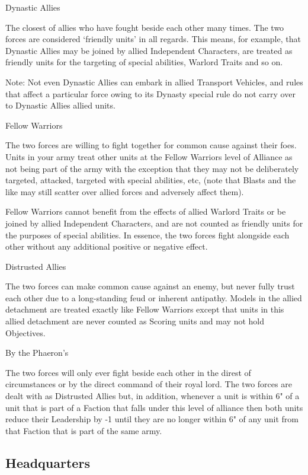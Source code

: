 \noindent
\yellowskull Dynastic Allies

The closest of allies who have fought beside each other many times. The two forces are considered ‘friendly units’ in all regards. This means, for example, that Dynastic Allies may be joined by allied Independent Characters, are treated as friendly units for the targeting of special abilities, Warlord Traits and so on.

Note: Not even Dynastic Allies can embark in allied Transport Vehicles, and rules that affect a particular force owing to its Dynasty special rule do not carry over to Dynastic Allies allied units.

\noindent
\blackskull Fellow Warriors

The two forces are willing to fight together for common cause against their foes. Units in your army treat other units at the Fellow Warriors level of Alliance as not being part of the army with the exception that they may not be deliberately targeted, attacked, targeted with special abilities, etc, (note that Blasts and the like may still scatter over allied forces and adversely affect them).

Fellow Warriors cannot benefit from the effects of allied Warlord Traits or be joined by allied Independent Characters, and are not counted as friendly units for the purposes of special abilities. In essence, the two forces fight alongside each other without any additional positive or negative effect.

\noindent
\greyskull Distrusted Allies

The two forces can make common cause against an enemy, but never fully trust each other due to a long-standing feud or inherent antipathy. Models in the allied detachment are treated exactly like Fellow Warriors except that units in this allied detachment are never counted as Scoring units and may not hold Objectives.

\noindent
\redskull By the Phaeron's

The two forces will only ever fight beside each other in the direst of circumstances or by the direct command of their royal lord. The two forces are dealt with as Distrusted Allies but, in addition, whenever a unit is within 6" of a unit that is part of a Faction that falls under this level of alliance then both units reduce their Leadership by -1 until they are no longer within 6" of any unit from that Faction that is part of the same army.


\newpage
\subsection{Headquarters}

